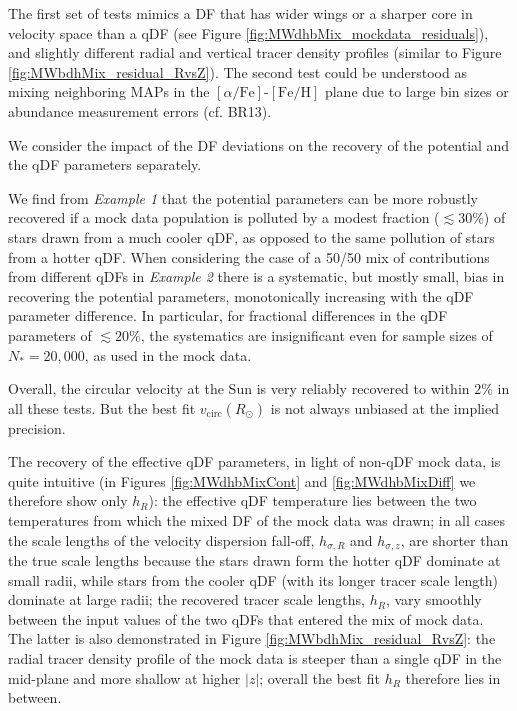 \documentclass[iop,revtex4,numberedappendix,appendixfloats]{emulateapj}
\newcommand{\MAPs}{MAPs}
\begin{document}
The first set of tests mimics a DF that has wider wings or a sharper core in velocity space than a qDF (see Figure \ref{fig:MWdhbMix_mockdata_residuals}), and slightly different radial and vertical tracer density profiles (similar to Figure \ref{fig:MWbdhMix_residual_RvsZ}). The second test could be understood as mixing neighboring \MAPs{} in the $[\alpha/\mathrm{Fe}]$-$[\mathrm{Fe}/\mathrm{H}]$ plane due to large bin sizes or abundance measurement errors (cf. BR13). 

We consider the impact of the DF deviations on the recovery of the potential and the qDF parameters separately. 

We find from \emph{Example 1} that the potential parameters can be more robustly recovered if a mock data population is polluted by a modest fraction ($\lesssim 30\%$) of stars drawn from a much cooler qDF, as opposed to the same pollution of stars from a hotter qDF. When considering the case of a 50/50 mix of contributions from different qDFs in \emph{Example 2} there is a systematic, but mostly small, bias in recovering the potential parameters, monotonically increasing with the qDF parameter difference. In particular, for fractional differences in the qDF parameters of $\lesssim 20\%$, the systematics are insignificant even for sample sizes of $N_{*} = 20,000$, as used in the mock data.

Overall, the circular velocity at the Sun is very reliably recovered to within $2\%$ in all these tests. But the best fit $v_\text{circ}(R_\odot)$ is not always unbiased at the implied precision.


The recovery of the effective qDF parameters, in light of non-qDF mock data, is quite intuitive (in Figures \ref{fig:MWdhbMixCont} and \ref{fig:MWdhbMixDiff} we therefore show only $h_R$): the effective qDF temperature lies between the two temperatures from which the mixed DF of the mock data was drawn; in all cases the scale lengths of the velocity dispersion fall-off, $h_{\sigma,R}$ and $h_{\sigma,z}$, are shorter than the true scale lengths because the stars drawn form the hotter qDF dominate at small radii, while stars from the cooler qDF (with its longer tracer scale length) dominate at large radii; the recovered tracer scale lengths, $h_R$, vary smoothly between the input values of the two qDFs that entered the mix of mock data. The latter is also demonstrated in Figure \ref{fig:MWbdhMix_residual_RvsZ}: the radial tracer density profile of the mock data is steeper than a single qDF in the mid-plane and more shallow at higher $|z|$; overall the best fit $h_R$ therefore lies in between.
\end{document}
